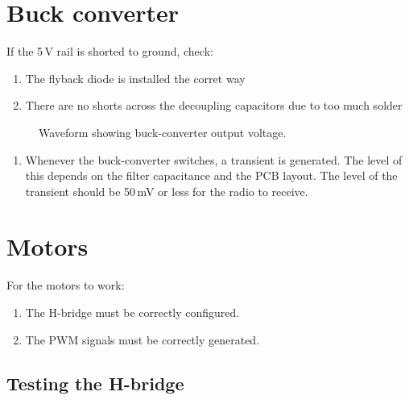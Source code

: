 \section{Buck converter}
\label{buck-converter-testing}

If the 5\,V rail is shorted to ground, check:
\begin{enumerate}
\item The flyback diode is installed the corret way
\item There are no shorts across the decoupling capacitors due to too
  much solder
\end{enumerate}


\begin{figure}[!h]
  \centering
  \caption{Waveform showing buck-converter output voltage.}
\end{figure}


\begin{enumerate}
\item Whenever the buck-converter switches, a transient is generated.
  The level of this depends on the filter capacitance and the PCB
  layout.  The level of the transient should be 50\,mV or less for the
  radio to receive.

\end{enumerate}


\section{Motors}
\label{motors-testing}

For the motors to work:
%
\begin{enumerate}
\item The H-bridge must be correctly configured.
\item The PWM signals must be correctly generated.
\end{enumerate}


\subsection{Testing the H-bridge}
\label{testing-the-h-bridge}

